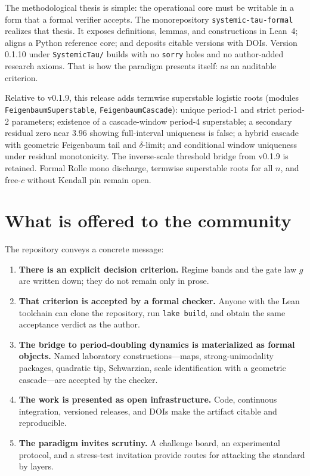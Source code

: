 \documentclass[11pt,a4paper]{article}
\begin{document}
The methodological thesis is simple: the operational core must be writable in a form that a formal verifier accepts. The monorepository \texttt{systemic-tau-formal} realizes that thesis. It exposes definitions, lemmas, and constructions in Lean~4; aligns a Python reference core; and deposits citable versions with DOIs. Version 0.1.10 under \texttt{SystemicTau/} builds with no \texttt{sorry} holes and no author-added research axioms. That is how the paradigm presents itself: as an auditable criterion.

Relative to v0.1.9, this release adds termwise superstable logistic roots
(modules \texttt{FeigenbaumSuperstable}, \texttt{FeigenbaumCascade}): unique
period-1 and strict period-2 parameters; existence of a cascade-window period-4
superstable; a secondary residual zero near \(3.96\) showing full-interval uniqueness
is false; a hybrid cascade with geometric Feigenbaum tail and \(\delta\)-limit; and
conditional window uniqueness under residual monotonicity. The inverse-scale
threshold bridge from v0.1.9 is retained. Formal Rolle mono discharge, termwise
superstable roots for all \(n\), and free-\(c\) without Kendall pin remain open.

\section{What is offered to the community}

The repository conveys a concrete message:

\begin{enumerate}[leftmargin=1.4em,itemsep=0.4em]
  \item \textbf{There is an explicit decision criterion.} Regime bands and the gate law \(g\) are written down; they do not remain only in prose.
  \item \textbf{That criterion is accepted by a formal checker.} Anyone with the Lean toolchain can clone the repository, run \texttt{lake build}, and obtain the same acceptance verdict as the author.
  \item \textbf{The bridge to period-doubling dynamics is materialized as formal objects.} Named laboratory constructions---maps, strong-unimodality packages, quadratic tip, Schwarzian, scale identification with a geometric cascade---are accepted by the checker.
  \item \textbf{The work is presented as open infrastructure.} Code, continuous integration, versioned releases, and DOIs make the artifact citable and reproducible.
  \item \textbf{The paradigm invites scrutiny.} A challenge board, an experimental protocol, and a stress-test invitation provide routes for attacking the standard by layers.
\end{enumerate}
\end{document}
